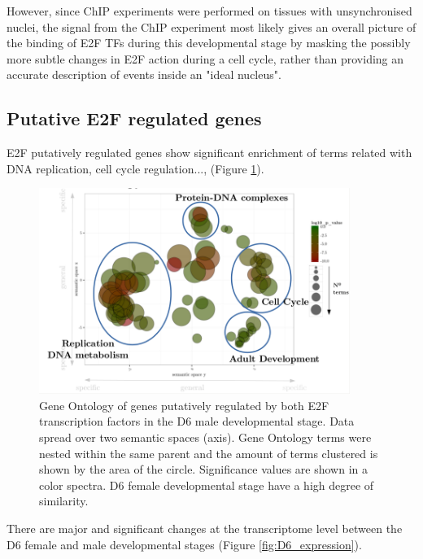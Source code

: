 \documentclass[11pt,twoside,a4paper]{report}
\begin{document}
		However, since ChIP experiments were performed on tissues with unsynchronised nuclei, the signal from the ChIP experiment most likely gives an overall picture of the binding of E2F TFs during this developmental stage by masking the possibly more subtle changes in E2F action during a cell cycle, rather than providing an accurate description of events inside an "ideal nucleus".
		
	\subsection{Putative E2F regulated genes}
		
    	E2F putatively regulated genes show significant enrichment of terms related with DNA replication, cell cycle regulation...,  (Figure \ref{fig:GO}).
		    	
		\begin{figure}[here]
			\centering
			\includegraphics[width=0.9\textwidth]{pngs/E2F_overlap_overlaps_GO.png}
			\caption{Gene Ontology of genes putatively regulated by both E2F transcription factors in the D6 male developmental stage.
				{\footnotesize 
					Data spread over two semantic spaces (axis).
					Gene Ontology terms were nested within the same parent and the amount of terms clustered is shown by the area of the circle.
					Significance values are shown in a color spectra.
					D6 female developmental stage have a high degree of similarity.
				}
			}
			\label{fig:GO}
		\end{figure}

    	There are major and significant changes at the transcriptome level between the D6 female and male developmental stages (Figure \ref{fig:D6_expression}).
		
\end{document}
